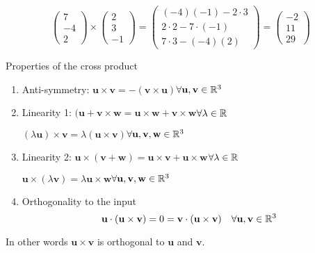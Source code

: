 \documentclass[10pt, a4paper]{article}
\newcommand{\mbf}[1]{\mathbf{#1}}
\begin{document}
\begin{example}
    \[
    \begin{pmatrix}
        7 \\ -4 \\ 2   
    \end{pmatrix}
    \times
    \begin{pmatrix}
        2 \\ 3 \\ -1
    \end{pmatrix}
    =
    \begin{pmatrix}
        (-4)(-1) - 2 \cdot 3 \\
        2 \cdot 2 - 7 \cdot (-1) \\
        7 \cdot 3 - (-4)(2)
    \end{pmatrix}
    =
    \begin{pmatrix}
        -2 \\ 11 \\ 29
    \end{pmatrix}
    \]
\end{example}

Properties of the cross product
\begin{enumerate}[label = (\roman*)]
    \item Anti-symmetry: $\mbf{u \times v} = -(\mbf{v \times u})$\quad$\forall\mbf{u, v} \in \R ^ 3$
    \item Linearity 1:
    $(\mbf{u + v} \times \mbf{w} = \mbf{u \times w} + \mbf{v \times w}$\quad$\forall\lambda \in \mathbb{R}$
    
    $(\lambda\mbf{u}) \times \mbf{v} = \lambda(\mbf{u \times v})$\quad$\forall\mbf{u, v, w} \in \R ^ 3$
    
    \item Linearity 2:
    $\mbf{u} \times (\mbf{v + w}) = \mbf{u \times v + u \times w}$\quad$\forall\lambda \in \mathbb{R}$
    
    $\mbf{u} \times (\lambda\mbf{v}) = \lambda\mbf{u \times w}$\quad$\forall\mbf{u, v, w} \in \R ^ 3$

    \item Orthogonality to the input
    \[
    \mbf{u \cdot (u \times v)} = 0 = \mbf{v \cdot (u \times v)}\quad\forall\mbf{u, v} \in \R ^ 3
    \]
\end{enumerate}
In other words $\mbf{u \times v}$ is orthogonal to $\mbf{u}$ and $\mbf{v}$.
\end{document}
